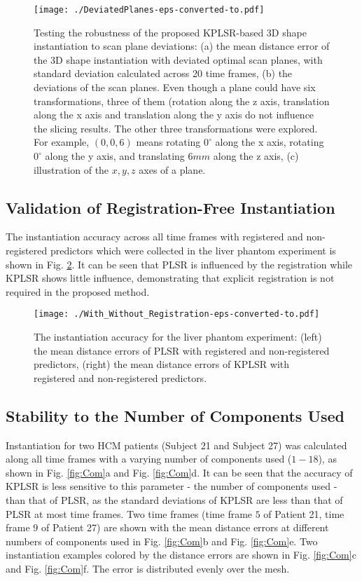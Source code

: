 \documentclass[review]{elsarticle}
\begin{document}
\begin{figure}[thpb]
\centering
\texttt{[image: ./DeviatedPlanes-eps-converted-to.pdf]}
\caption{Testing the robustness of the proposed KPLSR-based 3D shape instantiation to scan plane deviations: (a) the mean distance error of the 3D shape instantiation with deviated optimal scan planes, with standard deviation calculated across 20 time frames, (b) the deviations of the scan planes. Even though a plane could have six transformations, three of them (rotation along the z axis, translation along the x axis and translation along the y axis do not influence the slicing results. The other three transformations were explored. For example, $(0,0,6)$ means rotating $0^\circ$ along the x axis, rotating $0^\circ$ along the y axis, and translating $6mm$ along the z axis, (c) illustration of the $x, y, z$ axes of a plane.}
\label{fig: DeviatedPlanes}
\end{figure}

\subsection{Validation of Registration-Free Instantiation}
\label{sub: Registration}
The instantiation accuracy across all time frames with registered and non-registered predictors which were collected in the liver phantom experiment is shown in Fig. \ref{fig:With_Without_Registration}. It can be seen that PLSR is influenced by the registration while KPLSR shows little influence, demonstrating that explicit registration is not required in the proposed method.

\begin{figure}[thpb]
\centering
\texttt{[image: ./With\_Without\_Registration-eps-converted-to.pdf]}
\caption{The instantiation accuracy for the liver phantom experiment: (left) the mean distance errors of PLSR with registered and non-registered predictors, (right) the mean distance errors of KPLSR with registered and non-registered predictors.}
\label{fig:With_Without_Registration}
\end{figure}

\subsection{Stability to the Number of Components Used}
\label{sub: Stability to the Number of Components Used}
Instantiation for two HCM patients (Subject 21 and Subject 27) was calculated along all time frames with a varying number of components used ($1-18$), as shown in Fig. \ref{fig:Com}a and Fig. \ref{fig:Com}d. It can be seen that the accuracy of KPLSR is less sensitive to this parameter - the number of components used - than that of PLSR, as the standard deviations of KPLSR are less than that of PLSR at most time frames. Two time frames (time frame $5$ of Patient 21, time frame $9$ of Patient 27) are shown with the mean distance errors at different numbers of components used in Fig. \ref{fig:Com}b and Fig. \ref{fig:Com}e. Two instantiation examples colored by the distance errors are shown in Fig. \ref{fig:Com}c and Fig. \ref{fig:Com}f. The error is distributed evenly over the mesh.
\end{document}
